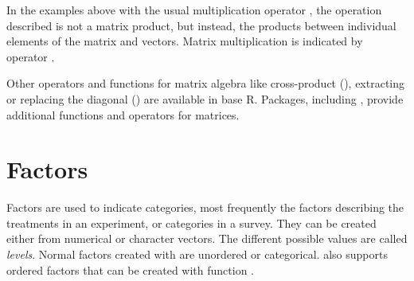 \documentclass[krantz2]{krantz}\usepackage{knitr}
\begin{document}
In the examples above with the usual multiplication operator \code{*}, the operation described is not a matrix product, but instead, the products between individual elements of the matrix and vectors. Matrix multiplication is indicated by operator \Roperator{\%*\%}.

\begin{knitrout}\footnotesize
{}\color{fgcolor}
\end{knitrout}

Other operators and functions for matrix algebra like cross-product (), extracting or replacing the diagonal () are available in base R. Packages, including , provide additional functions and operators for matrices.




\section{Factors}\label{sec:calc:factors}
Factors are used to indicate categories, most frequently the factors describing the treatments in an experiment, or categories in a survey. They can be created either from numerical or character vectors. The different possible values are called \emph{levels}. Normal factors created with  are unordered or categorical. \Rlang also supports ordered factors that can be created with function .
\end{document}
